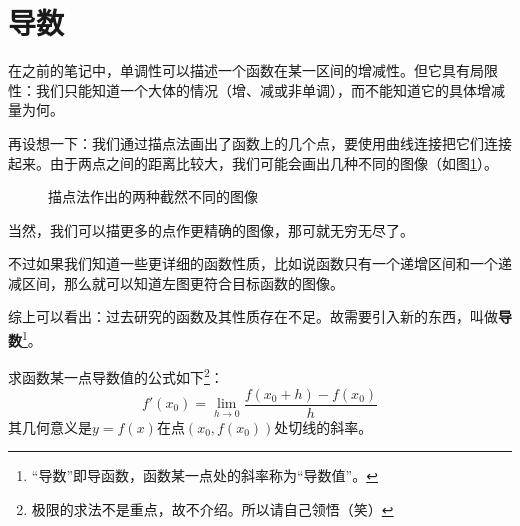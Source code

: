 \section{导数}
在之前的笔记中，单调性可以描述一个函数在某一区间的增减性。但它具有局限性：我们只能知道一个大体的情况（增、减或非单调），而不能知道它的具体增减量为何。

再设想一下：我们通过描点法画出了函数上的几个点，要使用曲线连接把它们连接起来。由于两点之间的距离比较大，我们可能会画出几种不同的图像（如图\ref{fig:two-different-function-figure}）。

\begin{figure}[htb]
    \centering
    \caption{描点法作出的两种截然不同的图像}
    \label{fig:two-different-function-figure}
\end{figure}

当然，我们可以描更多的点作更精确的图像，那可就无穷无尽了。

不过如果我们知道一些更详细的函数性质，比如说函数只有一个递增区间和一个递减区间，那么就可以知道左图更符合目标函数的图像。

综上可以看出：过去研究的函数及其性质存在不足。故需要引入新的东西，叫做\textbf{导数}\footnote{“导数”即导函数，函数某一点处的斜率称为“导数值”。}。

求函数某一点导数值的公式如下\footnote{极限的求法不是重点，故不介绍。所以请自己领悟（笑）}：\[f'(x_0)=\lim_{h\rightarrow 0}\frac{f(x_0+h)-f(x_0)}{h}\]其几何意义是$y=f(x)$在点$(x_0, f(x_0))$处切线的斜率。

